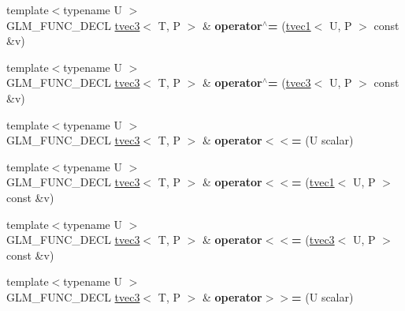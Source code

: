 \begin{DoxyCompactItemize}
{\footnotesize template$<$typename U $>$ }\\G\+L\+M\+\_\+\+F\+U\+N\+C\+\_\+\+D\+E\+CL \hyperlink{structglm_1_1tvec3}{tvec3}$<$ T, P $>$ \& {\bfseries operator$^\wedge$=} (\hyperlink{structglm_1_1tvec1}{tvec1}$<$ U, P $>$ const \&v)
\item 
\mbox{\label{structglm_1_1tvec3_a31247f55bc34542e94c0928ad1c1e5e5}} 
{\footnotesize template$<$typename U $>$ }\\G\+L\+M\+\_\+\+F\+U\+N\+C\+\_\+\+D\+E\+CL \hyperlink{structglm_1_1tvec3}{tvec3}$<$ T, P $>$ \& {\bfseries operator$^\wedge$=} (\hyperlink{structglm_1_1tvec3}{tvec3}$<$ U, P $>$ const \&v)
\item 
\mbox{\label{structglm_1_1tvec3_abadcfbf4495179ac2e32d2f986d7bbb6}} 
{\footnotesize template$<$typename U $>$ }\\G\+L\+M\+\_\+\+F\+U\+N\+C\+\_\+\+D\+E\+CL \hyperlink{structglm_1_1tvec3}{tvec3}$<$ T, P $>$ \& {\bfseries operator$<$$<$=} (U scalar)
\item 
\mbox{\label{structglm_1_1tvec3_af0d715a07138f9619ac7ee1924fa8940}} 
{\footnotesize template$<$typename U $>$ }\\G\+L\+M\+\_\+\+F\+U\+N\+C\+\_\+\+D\+E\+CL \hyperlink{structglm_1_1tvec3}{tvec3}$<$ T, P $>$ \& {\bfseries operator$<$$<$=} (\hyperlink{structglm_1_1tvec1}{tvec1}$<$ U, P $>$ const \&v)
\item 
\mbox{\label{structglm_1_1tvec3_af05b4498d260dd9d784292b6a7873a80}} 
{\footnotesize template$<$typename U $>$ }\\G\+L\+M\+\_\+\+F\+U\+N\+C\+\_\+\+D\+E\+CL \hyperlink{structglm_1_1tvec3}{tvec3}$<$ T, P $>$ \& {\bfseries operator$<$$<$=} (\hyperlink{structglm_1_1tvec3}{tvec3}$<$ U, P $>$ const \&v)
\item 
\mbox{\label{structglm_1_1tvec3_aa4fd6ddbdc563f18f8f172c27ee83e11}} 
{\footnotesize template$<$typename U $>$ }\\G\+L\+M\+\_\+\+F\+U\+N\+C\+\_\+\+D\+E\+CL \hyperlink{structglm_1_1tvec3}{tvec3}$<$ T, P $>$ \& {\bfseries operator$>$$>$=} (U scalar)
\item 
\mbox{\label{structglm_1_1tvec3_a7cb73c7e9a6756532e450515bc7f67ec}} 

\end{DoxyCompactItemize}
